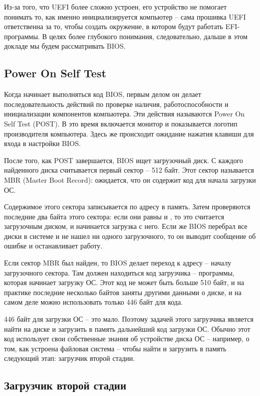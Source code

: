 \documentclass[a4page]{article}
\begin{document}
Из-за того, что UEFI более сложно устроен, его устройство не помогает понимать
то, как именно инициализируется компьютер -- сама прошивка UEFI ответственна за то,
чтобы создать окружение, в котором будут работать EFI-программы.
В целях более глубокого понимания, следовательно, дальше в этом докладе мы будем рассматривать BIOS.

\subsection{Power On Self Test}

Когда начинает выполняться код BIOS, первым делом он делает последовательность действий
по проверке наличия, работоспособности и инициализации компонентов компьютера.
Эти действия называются Power On Self Test (POST).
В это время включается монитор и показывается логотип производителя компьютера.
Здесь же происходит ожидание нажатия клавиши для входа в настройки BIOS.

После того, как POST завершается, BIOS ищет загрузочный диск.
С каждого найденного диска считывается первый сектор -- 512 байт.
Этот сектор называется MBR (Master Boot Record): ожидается, что он содержит
код для начала загрузки ОС.

Содержимое этого сектора записывается по адресу  в память.
Затем проверяются последние два байта этого сектора: если они равны  и ,
то это считается загрузочным диском, и начинается загрузка с него.
Если же BIOS перебрал все диски в системе и не нашел ни одного загрузочного,
то он выводит сообщение об ошибке и останавливает работу.

Если сектор MBR был найден, то BIOS делает переход к адресу  --
началу загрузочного сектора.
Там должен находиться код загрузчика -- программы, которая начинает загрузку ОС.
Этот код не может быть больше 510 байт, и на практике последние несколько байтов заняты другими данными о диске,
и на самом деле можно использовать только 446 байт для кода.

446 байт для загрузки ОС -- это мало.
Поэтому задачей этого загрузчика является найти на диске и загрузить в память дальнейший код загрузки ОС.
Обычно этот код использует свои собственные знания об устройстве диска ОС -- например, о том, как устроена
файловая система -- чтобы найти и загрузить в память следующий этап: загрузчик второй стадии.

\subsection{Загрузчик второй стадии}
\end{document}
